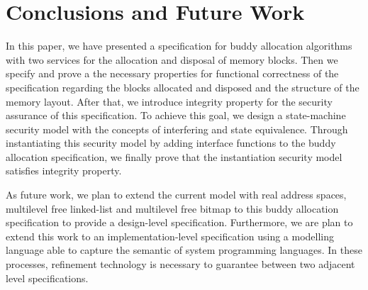 \section{Conclusions and Future Work}
In this paper, we have presented a specification for buddy allocation algorithms with two services for the allocation and disposal of memory blocks. Then we specify and prove a the necessary properties for functional correctness of the specification regarding the blocks allocated and disposed and the structure of the memory layout. After that, we introduce integrity property for the security assurance of this specification. To achieve this goal, we design a state-machine security model with the concepts of interfering and state equivalence. Through instantiating this security model by adding interface functions to the buddy allocation specification, we finally prove that the instantiation security model satisfies integrity property.

As future work, we plan to extend the current model with real address spaces, multilevel free linked-list and multilevel free bitmap to this buddy allocation specification to provide a design-level specification. Furthermore, we are plan to extend this work to an implementation-level specification using a modelling language able to capture the semantic of system programming languages. In these processes, refinement technology is necessary to guarantee between two adjacent level specifications.
